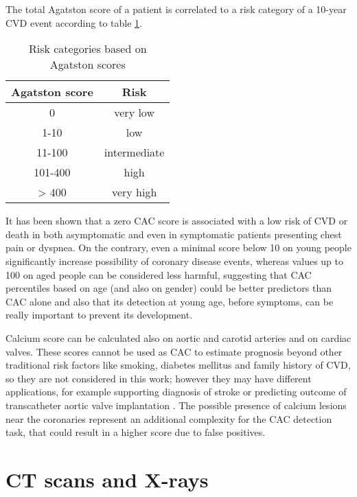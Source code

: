 The total Agatston score of a patient is correlated to a risk category of a 10-year CVD event according to table \ref{tab:agatston-risk}.
\begin{table}
    \centering
    \begin{tabular}{|c|c|}
        \hline
        Agatston score & Risk \\
        \hline
        0 & very low \\
        1-10 & low \\
        11-100 & intermediate \\
        101-400 & high \\
        > 400 & very high \\
        \hline
    \end{tabular}
    \caption{Risk categories based on Agatston scores \cite{vanvelzen2021ai}}
    \label{tab:agatston-risk}
\end{table}
It has been shown that a zero CAC score is associated with a low risk of CVD or death in both asymptomatic and even in symptomatic patients \cite{Czaja-Ziolkowska2022-pd} presenting chest pain or dyspnea.
On the contrary, even a minimal score below 10 on young people significantly increase possibility of coronary disease events, whereas values up to 100 on aged people can be considered less harmful, suggesting that CAC percentiles based on age (and also on gender) could be better predictors than CAC alone \cite{Czaja-Ziolkowska2022-pd} and also that its detection at young age, before symptoms, can be really important to prevent its development.

Calcium score can be calculated also on aortic and carotid arteries and on cardiac valves.
These scores cannot be used as CAC to estimate prognosis beyond other traditional risk factors \cite{Czaja-Ziolkowska2022-pd} like smoking, diabetes mellitus and family history of CVD, so they are not considered in this work; however they may have different applications, for example supporting diagnosis of stroke \cite{desai2018thoracic} or predicting outcome of transcatheter aortic valve implantation \cite{viegas2022significance}.
The possible presence of calcium lesions near the coronaries represent an additional complexity for the CAC detection task, that could result in a higher score due to false positives.


\section{CT scans and X-rays}

